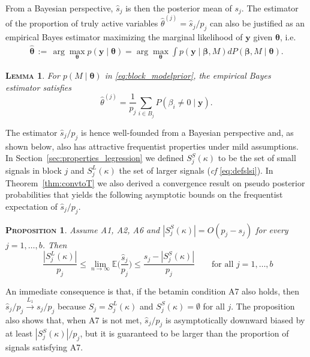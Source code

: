 \documentclass[aos]{imsart}
\theoremstyle{plain}
\newtheorem{prop}[thm]{\textsc{Proposition}}
\newtheorem{lem}[thm]{\textsc{Lemma}}
\newcommand{\E}{\mathbb{E}}
\newcommand{\bs}{\boldsymbol}
\begin{document}
From a Bayesian perspective, $\widehat{s}_j$ is then %
the posterior mean of $s_j$. The estimator of the proportion of truly active variables $\hat{\theta}^{(j)}= \widehat{s}_j/p_j$ can also be justified as an empirical Bayes estimator %
maximizing the marginal likelihood of $\bs y$ given $\bs \theta$, i.e.
\begin{eqnarray}
\hat{\bs \theta}
\,:=\, \arg\max_{\bs \theta} p(\bs y \mid \bs \theta)=
\arg\max_{\bs \theta} \int p(\bs y \mid \bs \beta, M) d P(\bs \beta, M \mid \bs \theta).
\nonumber
\end{eqnarray}

\begin{lem}\label{lem:empiricalbayesinterpret} For $p(M \mid \bs \theta)$ in \eqref{eq:block_modelprior}, the empirical Bayes estimator satisfies 
$$\hat{\theta}^{(j)} = \frac{1}{p_j}\sum_{i\in B_j}P(\beta_i \neq 0 \mid \bs y).$$
\end{lem}
The estimator $\widehat{s}_j/p_j$ is hence well-founded from a Bayesian perspective and, as shown below, also has attractive frequentist properties under mild assumptions. In Section~\ref{sec:properties_legression} we defined $S^{S}_j(\kappa)$ to be the set of small signals in block $j$ and  $S^{L}_j(\kappa)$ the set of larger signals (\emph{cf} \eqref{eq:defslsi}). In Theorem~\ref{thm:convtoT} we also derived a convergence result on pseudo posterior probabilities that yields the following asymptotic bounds on the frequentist expectation of $\widehat{s}_j/p_j$.
\begin{prop}
    \label{prop:shatconsistence}
Assume A1, A2, A6 and $|S^{S}_j(\kappa)|=O(p_j-s_j)$ for every $j=1,\ldots,b$. Then
$$ \,\, \frac{|S^{L}_j(\kappa)|}{p_j}\leq \lim_{n\to\infty}\E\bigg(\frac{\widehat{s}_j}{p_j}\bigg)\leq \frac{s_j-|S^{S}_j(\kappa)|}{p_j}\qquad\text{for all }j=1,\ldots,b$$
\end{prop}
An immediate consequence is that, if the betamin condition A7 also holds, then $\widehat{s}_j/p_j \stackrel{L_1}{\longrightarrow} s_j/p_j$
because $S_j=S_j^{L}(\kappa)$ and $S_j^{S}(\kappa)=\emptyset$ for all $j$. The proposition also shows that, when A7 is not met, $\widehat{s}_j/p_j$ is asymptotically downward biased by at least $|S^{S}_j(\kappa)|/p_j$, but it is guaranteed to be larger than the proportion of signals satisfying A7. 
\end{document}
